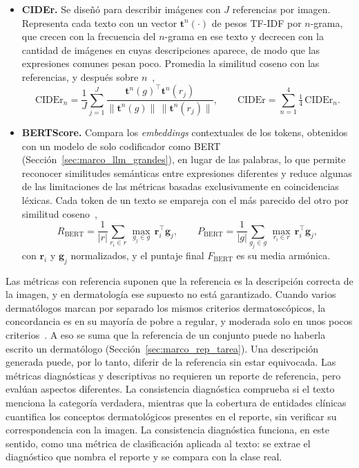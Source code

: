 \begin{itemize}
    \item \textbf{CIDEr.} Se diseñó para describir imágenes con $J$ referencias por imagen. Representa cada
    texto con un vector $\mathbf{t}^n(\cdot)$ de pesos TF-IDF por $n$-grama, que crecen con la frecuencia del
    $n$-grama en ese texto y decrecen con la cantidad de imágenes en cuyas descripciones aparece, de modo que las
    expresiones comunes pesan poco. Promedia la similitud coseno con las referencias, y después sobre
    $n$~\cite{vedantam2015cider},
    \begin{equation}
        \mathrm{CIDEr}_n = \frac{1}{J}\sum_{j=1}^{J}
        \frac{\mathbf{t}^n(g)^{\top}\mathbf{t}^n(r_j)}{\lVert\mathbf{t}^n(g)\rVert\,\lVert\mathbf{t}^n(r_j)\rVert},
        \qquad
        \mathrm{CIDEr} = \sum_{n=1}^{4} \tfrac{1}{4}\,\mathrm{CIDEr}_n.
        \label{eq:marco_cider}
    \end{equation}

    \item \textbf{BERTScore.} Compara los \emph{embeddings} contextuales de los tokens, obtenidos con un modelo
    de solo codificador como BERT (Sección~\ref{sec:marco_llm_grandes}), en lugar de las palabras, lo que permite reconocer similitudes semánticas entre expresiones diferentes y reduce algunas de las limitaciones de las métricas basadas exclusivamente en coincidencias léxicas. Cada token de un texto se empareja con el más parecido del otro por
    similitud coseno~\cite{zhang2020bertscore},
    \begin{equation}
        R_{\mathrm{BERT}} = \frac{1}{|r|}\sum_{r_i \in r}\,\max_{g_j \in g}\, \mathbf{r}_i^{\top}\mathbf{g}_j,
        \qquad
        P_{\mathrm{BERT}} = \frac{1}{|g|}\sum_{g_j \in g}\,\max_{r_i \in r}\, \mathbf{r}_i^{\top}\mathbf{g}_j,
        \label{eq:marco_bertscore}
    \end{equation}
    con $\mathbf{r}_i$ y $\mathbf{g}_j$ normalizados, y el puntaje final $F_{\mathrm{BERT}}$ es su media armónica.
\end{itemize}

Las métricas con referencia suponen que la referencia es la descripción correcta de la imagen, y en dermatología
ese supuesto no está garantizado. Cuando varios dermatólogos marcan por separado los mismos criterios
dermatoscópicos, la concordancia es en su mayoría de pobre a regular, y moderada solo en unos pocos
criterios~\cite{carrera2016validity}. A eso se suma que la referencia de un conjunto puede no haberla escrito un
dermatólogo (Sección~\ref{sec:marco_rep_tarea}). Una descripción generada puede, por lo tanto, diferir de la
referencia sin estar equivocada. Las métricas diagnósticas y descriptivas no requieren un reporte de referencia, pero evalúan aspectos diferentes. La consistencia diagnóstica comprueba si el texto menciona la categoría verdadera, mientras que la cobertura de entidades clínicas cuantifica los conceptos dermatológicos presentes en el reporte, sin verificar su correspondencia con la imagen. La consistencia diagnóstica funciona, en este sentido, como una métrica de clasificación aplicada al texto: se extrae el diagnóstico que nombra el reporte y se compara con la clase real.

